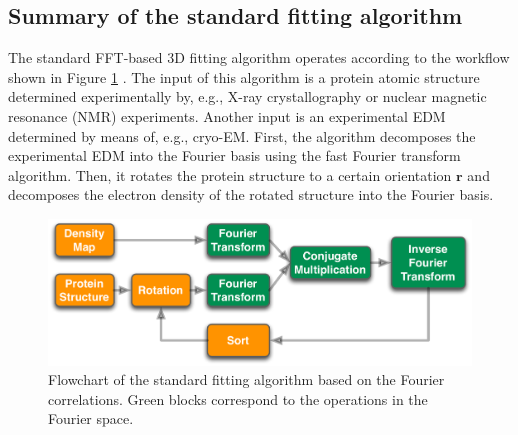 \subsection{Summary of the standard fitting algorithm}

The standard FFT-based 3D fitting algorithm operates according to
the workflow shown in Figure \ref{fig:CartesianFFT} \cite{Katchalski-Katzir1992,Gabb1997,Chacon2002}. The input of
this algorithm is a protein atomic structure determined experimentally
by, e.g., X-ray crystallography or nuclear magnetic resonance (NMR)
experiments. Another input is an experimental EDM
determined by means of, e.g., cryo-EM.
First, the algorithm decomposes
the experimental EDM into the Fourier basis using the fast Fourier
transform algorithm. Then, it rotates the protein
structure to a certain orientation $\mathbf{r}$ and decomposes the electron density of the
rotated structure into the Fourier basis. 

\begin{figure}[ht!]
\label{fig:CartesianFFT}
\caption[Flowchart of the standard fitting algorithm]{Flowchart of the standard fitting algorithm based on the Fourier correlations.
Green blocks correspond to the operations in the Fourier space.}
\includegraphics[width=1\textwidth]{Hermite/Fig/figure1}
\end{figure}


